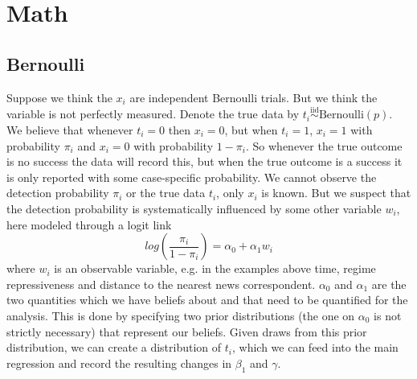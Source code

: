 \documentclass[fignum,letterpaper,12pt]{article}
\newcommand{\iid}{\stackrel{\mathrm{iid}}{\sim}}
\begin{document}
\section{Math}

\subsection{Bernoulli}

Suppose we think the $x_i$ are independent Bernoulli trials. But we think the variable is not perfectly measured. Denote the true data by $t_i \iid \text{Bernoulli}(p)$. We believe that whenever $t_i=0$ then $x_i=0$, but when $t_i=1$, $x_i=1$ with probability $\pi_i$ and $x_i=0$ with probability $1-\pi_i$. So whenever the true outcome is no success the data will record this, but when the true outcome is a success it is only reported with some case-specific probability. We cannot observe the detection probability $\pi_i$ or the true data $t_i$, only $x_i$ is known. But we suspect that the detection probability is systematically influenced by some other variable $w_i$, here modeled through a logit link
\begin{equation}
log \left ( \frac{\pi_i}{1-\pi_i} \right ) = \alpha_0 + \alpha_1 w_i
\end{equation}
where $w_i$ is an observable variable, e.g. in the examples above time, regime repressiveness and distance to the nearest news correspondent. $\alpha_0$ and $\alpha_1$ are the two quantities which we have beliefs about and that need to be quantified for the analysis. This is done by specifying two prior distributions (the one on $\alpha_0$ is not strictly necessary) that represent our beliefs. Given draws from this prior distribution, we can create a distribution of $t_i$, which we can feed into the main regression and record the resulting changes in $\beta_1$ and $\gamma$. 
\end{document}
